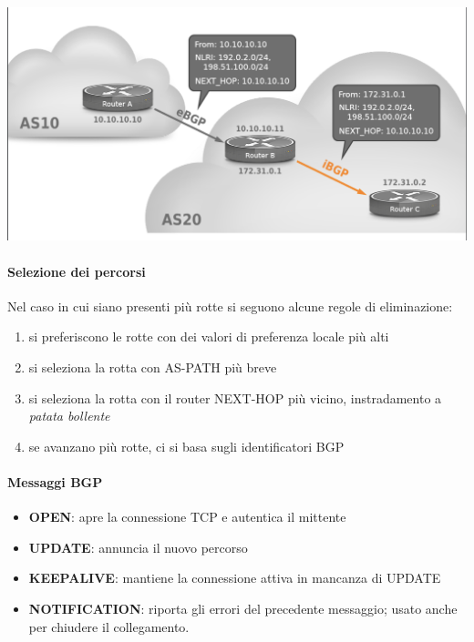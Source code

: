 \documentclass{report}
\begin{document}
\begin{center}
		\includegraphics[width=0.7\linewidth]{next-hop}
	\end{center}

\hypertarget{header-n330}{%
\paragraph{Selezione dei percorsi}\label{header-n330}}

Nel caso in cui siano presenti più rotte si seguono alcune regole di
eliminazione:

\begin{enumerate}
\def\labelenumi{\arabic{enumi}.}
\item
  si preferiscono le rotte con dei valori di preferenza locale più alti
\item
  si seleziona la rotta con AS-PATH più breve
\item
  si seleziona la rotta con il router NEXT-HOP più vicino, instradamento
  a \emph{patata bollente}
\item
  se avanzano più rotte, ci si basa sugli identificatori BGP
\end{enumerate}

\hypertarget{header-n327}{%
\paragraph{Messaggi BGP}\label{header-n327}}

\begin{itemize}
\item
  \textbf{OPEN}: apre la connessione TCP e autentica il mittente
\item
  \textbf{UPDATE}: annuncia il nuovo percorso
\item
  \textbf{KEEPALIVE}: mantiene la connessione attiva in mancanza di
  UPDATE
\item
  \textbf{NOTIFICATION}: riporta gli errori del precedente messaggio;
  usato anche per chiudere il collegamento.
\end{itemize}
\end{document}
